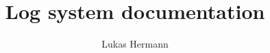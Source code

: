 \documentclass[12pt, a4paper]{article}
\begin{document}
\title{Log system documentation}
\author{Lukas Hermann}
\maketitle

\tableofcontents

\newpage


\end{document}
